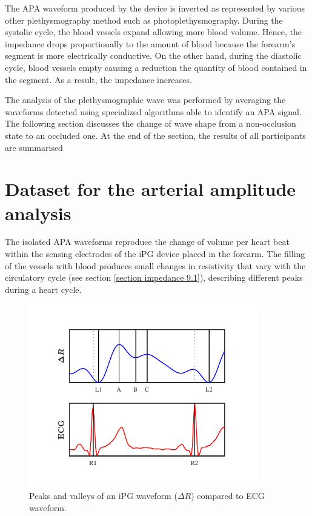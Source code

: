 The APA waveform produced by the device is inverted as represented by various other plethysmography method such as photoplethysmography. During the systolic cycle, the blood vessels expand allowing more blood volume. Hence, the impedance drops proportionally to the amount of blood because the forearm's segment is more electrically conductive. On the other hand, during the diastolic cycle, blood vessels empty causing a reduction the quantity of blood contained in the segment. As a result, the impedance increases. 

The analysis of the plethysmographic wave was performed by averaging the waveforms detected using specialized algorithms able to identify an APA signal. The following section discusses the change of wave shape from a non-occlusion state to an occluded one. At the end of the section, the results of all participants are summarised 

\section{Dataset for the arterial amplitude analysis}
\label{section apa 1}
The isolated APA waveforms reproduce the change of volume per heart beat within the sensing electrodes of the iPG device placed in the forearm. The filling of the vessels with blood produces small changes in resistivity that vary with the circulatory cycle (see section \ref{section impedance 9.1}), describing different peaks during a heart cycle. 

\begin{figure}[!htpb]
	\centering
	\includegraphics[width=10cm,keepaspectratio]{figure_apa_1}    
	\caption[Marker ppoints in an iPG waveform]{Peaks and valleys of an iPG waveform ($\Delta R$) compared to ECG waveform.}
	\label{fig:markers iPG}
\end{figure}

